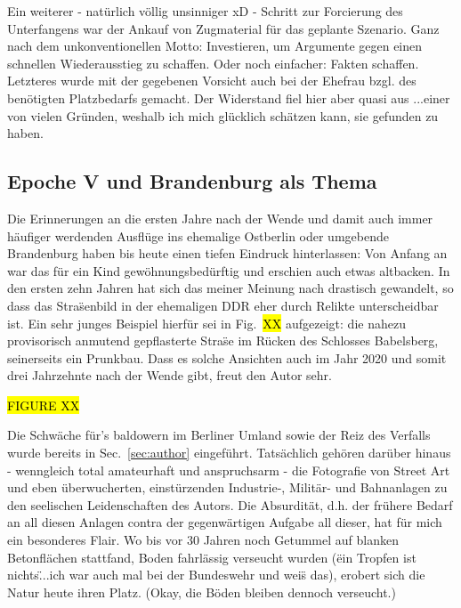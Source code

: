 Ein weiterer - nat\"urlich v\"ollig unsinniger xD - Schritt zur Forcierung des Unterfangens war der Ankauf von Zugmaterial f\"ur das geplante Szenario.
Ganz nach dem unkonventionellen Motto: Investieren, um Argumente gegen einen schnellen Wiederausstieg zu schaffen.
Oder noch einfacher: Fakten schaffen.
Letzteres wurde mit der gegebenen Vorsicht auch bei der Ehefrau bzgl. des ben\"otigten Platzbedarfs gemacht.
Der Widerstand fiel hier aber quasi aus ...einer von vielen Gr\"unden, weshalb ich mich gl\"ucklich sch\"atzen kann, sie gefunden zu haben.



\subsection{Epoche V und Brandenburg als Thema}
\label{sec:theme}

Die Erinnerungen an die ersten Jahre nach der Wende und damit auch immer h\"aufiger werdenden Ausfl\"uge ins ehemalige Ostberlin oder umgebende Brandenburg haben bis heute einen tiefen Eindruck hinterlassen:
Von Anfang an war das f\"ur ein Kind gew\"ohnungsbed\"urftig und erschien auch etwas altbacken.
In den ersten zehn Jahren hat sich das meiner Meinung nach drastisch gewandelt, so dass das Stra\"senbild in der ehemaligen DDR eher durch Relikte unterscheidbar ist.
Ein sehr junges Beispiel hierf\"ur sei in Fig.~\hl{XX} aufgezeigt:
die nahezu provisorisch anmutend gepflasterte Stra\"se im R\"ucken des Schlosses Babelsberg, seinerseits ein Prunkbau.
Dass es solche Ansichten auch im Jahr 2020 und somit drei Jahrzehnte nach der Wende gibt, freut den Autor sehr.

\hl{FIGURE XX}

Die Schw\"ache f\"ur's baldowern im Berliner Umland sowie der Reiz des Verfalls wurde bereits in Sec.~\ref{sec:author} eingef\"uhrt.
Tats\"achlich geh\"oren dar\"uber hinaus - wenngleich total amateurhaft und anspruchsarm - die Fotografie von Street Art und eben \"uberwucherten, einst\"urzenden Industrie-, Milit\"ar- und Bahnanlagen zu den seelischen Leidenschaften des Autors.
Die Absurdit\"at, d.h. der fr\"uhere Bedarf an all diesen Anlagen contra der gegenw\"artigen Aufgabe all dieser, hat f\"ur mich ein besonderes Flair.
Wo bis vor 30 Jahren noch Getummel auf blanken Betonfl\"achen stattfand, Boden fahrl\"assig verseucht wurden (\"ein Tropfen ist nichts\" ...ich war auch mal bei der Bundeswehr und wei\"s das), erobert sich die Natur heute ihren Platz.
(Okay, die B\"oden bleiben dennoch verseucht.)

